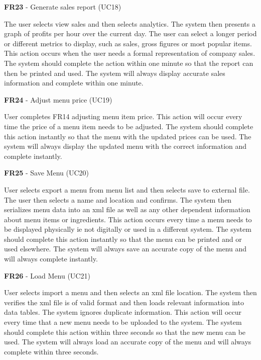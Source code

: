 \noindent \textbf{FR23} - Generate sales report (UC18)\\
\begin{small}
	The user selects view sales and then selects analytics. The system then presents a graph of profits per hour over the current day. The user can select a longer period or different metrics to display, such as sales, gross figures or most popular items. This action occurs when the user needs a formal representation of company sales. The system should complete the action within one minute so that the report can then be printed and used. The system will always display accurate sales information and complete within one minute.\\
\end{small}
\linebreak

\noindent \textbf{FR24} - Adjust menu price (UC19)\\
\begin{small}
	User completes FR14 adjusting menu item price. This action will occur every time the price of a menu item needs to be adjusted. The system should complete this action instantly so that the menu with the updated prices can be used. The system will always display the updated menu with the correct information and complete instantly.\\
\end{small}
\linebreak

\noindent \textbf{FR25} - Save Menu (UC20)\\
\begin{small}
	User selects export a menu from menu list and then selects save to external file. The user then selects a name and location and confirms. The system then serializes menu data into an xml file as well as any other dependent information about menu items or ingredients. This action occurs every time a menu needs to be displayed physically ie not digitally or used in a different system. The system should complete this action instantly so that the menu can be printed and or used elsewhere. The system will always save an accurate copy of the menu and will always complete instantly.\\
\end{small}
\linebreak

\noindent \textbf{FR26} - Load Menu (UC21)\\
\begin{small}
	User selects import a menu and then selects an xml file location. The system then verifies the xml file is of valid format and then loads relevant information into data tables. The system ignores duplicate information. This action will occur every time that a new menu needs to be uploaded to the system. The system should complete this action within three seconds so that the new menu can be used. The system will always load an accurate copy of the menu and will always complete within three seconds.\\
\end{small}
\linebreak

